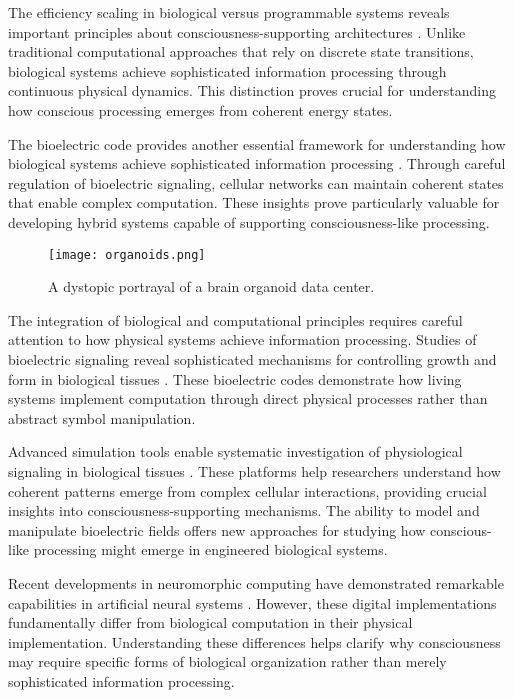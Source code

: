 \begin{refsection}
The efficiency scaling in biological versus programmable systems reveals important principles about consciousness-supporting architectures \cite{Conrad1995}. Unlike traditional computational approaches that rely on discrete state transitions, biological systems achieve sophisticated information processing through continuous physical dynamics. This distinction proves crucial for understanding how conscious processing emerges from coherent energy states.

The bioelectric code provides another essential framework for understanding how biological systems achieve sophisticated information processing \cite{Levin2018}. Through careful regulation of bioelectric signaling, cellular networks can maintain coherent states that enable complex computation. These insights prove particularly valuable for developing hybrid systems capable of supporting consciousness-like processing.

\begin{figure}[h]
    \centering
    \texttt{[image: organoids.png]}

    \caption{A dystopic portrayal of a brain organoid data center.}
\end{figure}

The integration of biological and computational principles requires careful attention to how physical systems achieve information processing. Studies of bioelectric signaling reveal sophisticated mechanisms for controlling growth and form in biological tissues \cite{Levin2018}. These bioelectric codes demonstrate how living systems implement computation through direct physical processes rather than abstract symbol manipulation.

Advanced simulation tools enable systematic investigation of physiological signaling in biological tissues \cite{Pietak2017}. These platforms help researchers understand how coherent patterns emerge from complex cellular interactions, providing crucial insights into consciousness-supporting mechanisms. The ability to model and manipulate bioelectric fields offers new approaches for studying how conscious-like processing might emerge in engineered biological systems.

Recent developments in neuromorphic computing have demonstrated remarkable capabilities in artificial neural systems \cite{Merolla2014}. However, these digital implementations fundamentally differ from biological computation in their physical implementation. Understanding these differences helps clarify why consciousness may require specific forms of biological organization rather than merely sophisticated information processing.


\end{refsection}
